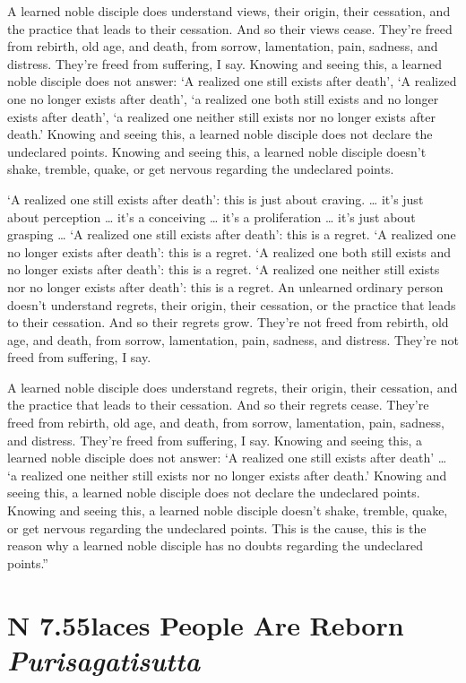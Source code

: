 \documentclass[12pt,openany]{book}%
\newcommand*{\suttatitleacronym}[1]{\smaller[2]{#1}\vspace*{.3em}}
\newcommand*{\suttatitletranslation}[1]{\linebreak{#1}}
\newcommand*{\suttatitleroot}[1]{\linebreak\smaller[2]\itshape{#1}}
\newcommand*{\tocacronym}[1]{\hspace*{-3.3em}{#1}\quad}
\newcommand*{\toctranslation}[1]{#1}
\newcommand*{\tocroot}[1]{(\textit{#1})}
\begin{document}
A learned noble disciple does understand views, their origin, their cessation, and the practice that leads to their cessation. And so their views cease. They’re freed from rebirth, old age, and death, from sorrow, lamentation, pain, sadness, and distress. They’re freed from suffering, I say. Knowing and seeing this, a learned noble disciple does not answer: ‘A realized one still exists after death’, ‘A realized one no longer exists after death’, ‘a realized one both still exists and no longer exists after death’, ‘a realized one neither still exists nor no longer exists after death.’ Knowing and seeing this, a learned noble disciple does not declare the undeclared points. Knowing and seeing this, a learned noble disciple doesn’t shake, tremble, quake, or get nervous regarding the undeclared points. 

‘A realized one still exists after death’: this is just about craving. … it’s just about perception … it’s a conceiving … it’s a proliferation … it’s just about grasping … ‘A realized one still exists after death’: this is a regret. ‘A realized one no longer exists after death’: this is a regret. ‘A realized one both still exists and no longer exists after death’: this is a regret. ‘A realized one neither still exists nor no longer exists after death’: this is a regret. An unlearned ordinary person doesn’t understand regrets, their origin, their cessation, or the practice that leads to their cessation. And so their regrets grow. They’re not freed from rebirth, old age, and death, from sorrow, lamentation, pain, sadness, and distress. They’re not freed from suffering, I say. 

A learned noble disciple does understand regrets, their origin, their cessation, and the practice that leads to their cessation. And so their regrets cease. They’re freed from rebirth, old age, and death, from sorrow, lamentation, pain, sadness, and distress. They’re freed from suffering, I say. Knowing and seeing this, a learned noble disciple does not answer: ‘A realized one still exists after death’ … ‘a realized one neither still exists nor no longer exists after death.’ Knowing and seeing this, a learned noble disciple does not declare the undeclared points. Knowing and seeing this, a learned noble disciple doesn’t shake, tremble, quake, or get nervous regarding the undeclared points. This is the cause, this is the reason why a learned noble disciple has no doubts regarding the undeclared points.” 

%
\section*{{\suttatitleacronym AN 7.55}{\suttatitletranslation Places People Are Reborn }{\suttatitleroot Purisagatisutta}}
\addcontentsline{toc}{section}{\tocacronym{AN 7.55} \toctranslation{Places People Are Reborn } \tocroot{Purisagatisutta}}
\end{document}
